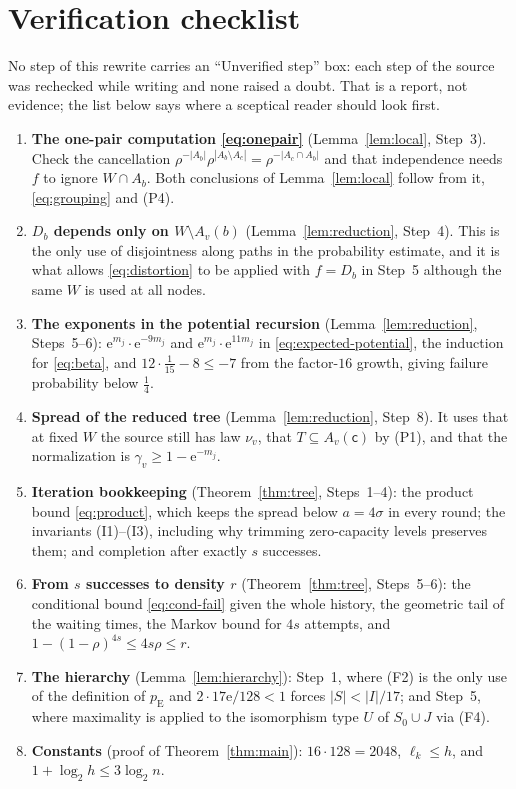 \documentclass[11pt]{article}
\numberwithin{equation}{section}
\newcommand{\pE}{p_{\mathrm E}}
\newcommand{\ee}{\mathrm e}
\newcommand{\src}{\mathsf c}
\begin{document}
\section{Verification checklist}

No step of this rewrite carries an ``Unverified step'' box: each step
of the source was rechecked while writing and none raised a doubt. That
is a report, not evidence; the list below says where a sceptical reader
should look first.

\begin{enumerate}[leftmargin=2em,itemsep=3pt]
 \item \textbf{The one-pair computation \eqref{eq:onepair}}
 (Lemma~\ref{lem:local}, Step~3). Check the cancellation
 $\rho^{-|A_b|}\rho^{|A_b\setminus A_c|}=\rho^{-|A_c\cap A_b|}$ and that
 independence needs $f$ to ignore $W\cap A_b$. Both conclusions of
 Lemma~\ref{lem:local} follow from it, \eqref{eq:grouping} and
 (P4).
 \item \textbf{$D_b$ depends only on $W\setminus A_v(b)$}
 (Lemma~\ref{lem:reduction}, Step~4). This is the only use of
 disjointness along paths in the probability estimate, and it is what
 allows \eqref{eq:distortion} to be applied with $f=D_b$ in Step~5
 although the same $W$ is used at all nodes.
 \item \textbf{The exponents in the potential recursion}
 (Lemma~\ref{lem:reduction}, Steps~5--6):
 $\ee^{m_j}\cdot\ee^{-9m_j}$ and $\ee^{m_j}\cdot\ee^{11m_j}$ in
 \eqref{eq:expected-potential}, the induction for \eqref{eq:beta}, and
 $12\cdot\frac1{15}-8\le-7$ from the factor-$16$ growth, giving failure
 probability below $\frac14$.
 \item \textbf{Spread of the reduced tree}
 (Lemma~\ref{lem:reduction}, Step~8). It uses that at fixed $W$ the
 source still has law $\nu_v$, that $T\subseteq A_v(\src)$ by (P1), and
 that the normalization is $\gamma_v\ge1-\ee^{-m_j}$.
 \item \textbf{Iteration bookkeeping} (Theorem~\ref{thm:tree},
 Steps~1--4): the product bound \eqref{eq:product}, which keeps the
 spread below $a=4\sigma$ in every round; the invariants (I1)--(I3),
 including why trimming zero-capacity levels preserves them; and
 completion after exactly $s$ successes.
 \item \textbf{From $s$ successes to density $r$}
 (Theorem~\ref{thm:tree}, Steps~5--6): the conditional bound
 \eqref{eq:cond-fail} given the whole history, the geometric tail of
 the waiting times, the Markov bound for $4s$ attempts, and
 $1-(1-\rho)^{4s}\le4s\rho\le r$.
 \item \textbf{The hierarchy} (Lemma~\ref{lem:hierarchy}): Step~1,
 where (F2) is the only use of the definition of $\pE$ and
 $2\cdot17\ee/128<1$ forces $|S|<|I|/17$; and Step~5, where maximality
 is applied to the isomorphism type $U$ of $S_0\cup J$ via (F4).
 \item \textbf{Constants} (proof of Theorem~\ref{thm:main}):
 $16\cdot128=2048$, $\ell_k\le h$, and $1+\log_2h\le3\log_2n$.
\end{enumerate}
\end{document}
